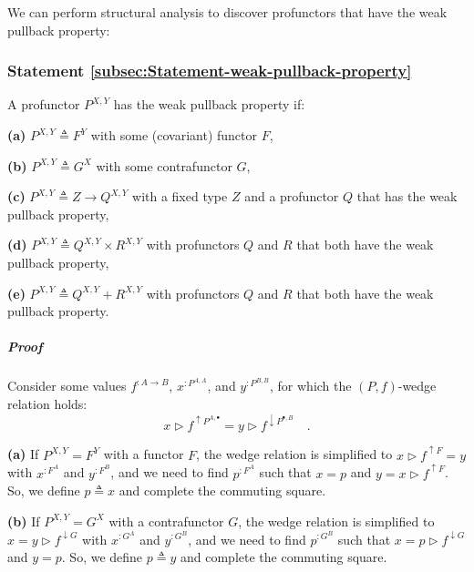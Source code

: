 We can perform structural analysis to discover profunctors that have
the weak pullback property:

\subsubsection{Statement \label{subsec:Statement-weak-pullback-property}\ref{subsec:Statement-weak-pullback-property}}

A profunctor $P^{X,Y}$ has the weak pullback property if:

\textbf{(a)} $P^{X,Y}\triangleq F^{Y}$ with some (covariant) functor
$F$,

\textbf{(b)} $P^{X,Y}\triangleq G^{X}$ with some contrafunctor $G$,

\textbf{(c)} $P^{X,Y}\triangleq Z\rightarrow Q^{X,Y}$ with a fixed
type $Z$ and a profunctor $Q$ that has the weak pullback property,

\textbf{(d)} $P^{X,Y}\triangleq Q^{X,Y}\times R^{X,Y}$ with profunctors
$Q$ and $R$ that both have the weak pullback property,

\textbf{(e)} $P^{X,Y}\triangleq Q^{X,Y}+R^{X,Y}$ with profunctors
$Q$ and $R$ that both have the weak pullback property.

\subparagraph{Proof}

Consider some values $f^{:A\rightarrow B}$, $x^{:P^{A,A}}$, and
$y^{:P^{B,B}}$, for which the $\left(P,f\right)$-wedge relation
holds:
\[
x\triangleright f^{\uparrow P^{A,\bullet}}=y\triangleright f^{\downarrow P^{\bullet,B}}\quad.
\]

\textbf{(a)} If $P^{X,Y}=F^{Y}$ with a functor $F$, the wedge relation
is simplified to $x\triangleright f^{\uparrow F}=y$ with $x^{:F^{A}}$
and $y^{:F^{B}}$, and we need to find $p^{:F^{A}}$ such that $x=p$
and $y=x\triangleright f^{\uparrow F}$. So, we define $p\triangleq x$
and complete the commuting square.

\textbf{(b)} If $P^{X,Y}=G^{X}$ with a contrafunctor $G$, the wedge
relation is simplified to $x=y\triangleright f^{\downarrow G}$ with
$x^{:G^{A}}$ and $y^{:G^{B}}$, and we need to find $p^{:G^{B}}$
such that $x=p\triangleright f^{\downarrow G}$ and $y=p$. So, we
define $p\triangleq y$ and complete the commuting square.

